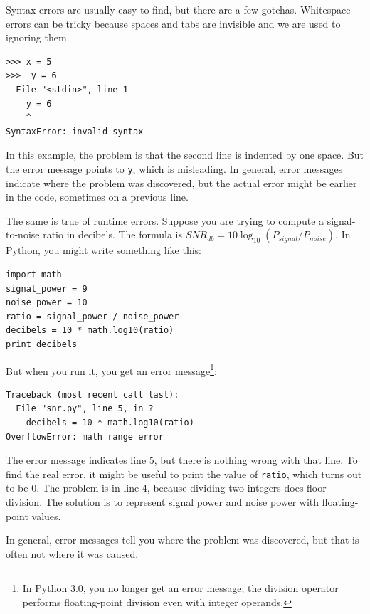 \documentclass[10pt]{book}
\begin{document}
Syntax errors are usually easy to find, but there are a few
gotchas.  Whitespace errors can be tricky because spaces and
tabs are invisible and we are used to ignoring them.


\beforeverb
\begin{verbatim}
>>> x = 5
>>>  y = 6
  File "<stdin>", line 1
    y = 6
    ^
SyntaxError: invalid syntax
\end{verbatim}
\afterverb
%
In this example, the problem is that the second line is indented by
one space.  But the error message points to {\tt y}, which is
misleading.  In general, error messages indicate where the problem was
discovered, but the actual error might be earlier in the code,
sometimes on a previous line.


The same is true of runtime errors.  Suppose you are trying
to compute a signal-to-noise ratio in decibels.  The formula
is $SNR_{db} = 10 \log_{10} (P_{signal} / P_{noise})$.  In Python,
you might write something like this:

\beforeverb
\begin{verbatim}
import math
signal_power = 9
noise_power = 10
ratio = signal_power / noise_power
decibels = 10 * math.log10(ratio)
print decibels
\end{verbatim}
\afterverb
%
But when you run it, you get an error message\footnote{In Python 3.0,
  you no longer get an error message; the division operator performs
  floating-point division even with integer operands.}:


\beforeverb
\begin{verbatim}
Traceback (most recent call last):
  File "snr.py", line 5, in ?
    decibels = 10 * math.log10(ratio)
OverflowError: math range error
\end{verbatim}
\afterverb
%
The error message indicates line 5, but there is nothing
wrong with that line.  To find the real error, it might be
useful to print the value of {\tt ratio}, which turns out to
be 0.  The problem is in line 4, because dividing two integers
does floor division.  The solution is to represent signal power
and noise power with floating-point values.


In general, error messages tell you where the problem was discovered, 
but that is often not where it was caused.
\end{document}
